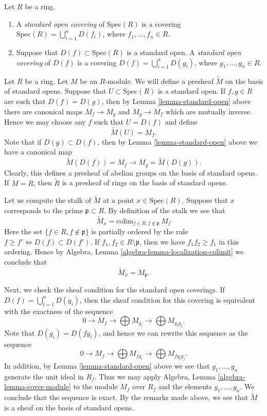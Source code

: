 \begin{definition}
\label{definition-standard-covering}
Let $R$ be a ring.
\begin{enumerate}
\item A {\it standard open covering} of $\text{Spec}(R)$
is a covering $\text{Spec}(R) = \bigcup_{i=1}^n D(f_i)$,
where $f_1,\ldots, f_n \in R$.
\item Suppose that $D(f) \subset \text{Spec}(R)$ is a standard
open. A {\it standard open covering} of $D(f)$
is a covering $D(f) = \bigcup_{i=1}^n D(g_i)$,
where $g_1,\ldots, g_n \in R$.
\end{enumerate}
\end{definition}

\noindent
Let $R$ be a ring. Let $M$ be an $R$-module. We will define
a presheaf $\widetilde M$ on the basis of standard opens.
Suppose that $U \subset \text{Spec}(R)$ is a standard open.
If $f, g \in R$ are such that $D(f) = D(g)$, then
by Lemma \ref{lemma-standard-open} above there are canonical
maps $M_f \to M_g$ and $M_g \to M_f$ which are mutually inverse.
Hence we may choose any $f$ such that $U = D(f)$
and define
$$
\widetilde M(U) = M_f.
$$
Note that if $D(g) \subset D(f)$, then by
Lemma \ref{lemma-standard-open} above we have
a canonical map
$$
\widetilde M(D(f)) = M_f \longrightarrow M_g = \widetilde M(D(g)).
$$
Clearly, this defines a presheaf of abelian groups on the basis
of standard opens. If $M = R$, then $\widetilde R$ is a presheaf
of rings on the basis of standard opens.

\medskip\noindent
Let us compute the stalk of $\widetilde M$ at a point $x \in \text{Spec}(R)$.
Suppose that $x$ corresponds to the prime $\mathfrak p \subset R$.
By definition of the stalk we see that
$$
\widetilde M_x = \text{colim}_{f\in R, f\not\in \mathfrak p}\ M_f
$$
Here the set $\{f\in R, f\not\in \mathfrak p\}$ is partially
ordered by the rule $f \geq f' \Leftrightarrow D(f) \subset D(f')$.
If $f_1, f_2 \in R \setminus \mathfrak p$, then we have
$f_1f_2 \geq f_1$ in this ordering. Hence by
Algebra, Lemma \ref{algebra-lemma-localization-colimit}
we conclude that
$$
\widetilde M_x = M_{\mathfrak p}.
$$

\medskip\noindent
Next, we check the sheaf condition for the standard open coverings.
If $D(f) = \bigcup_{i=1}^n D(g_i)$, then the sheaf condition
for this covering is equivalent with the exactness of the
sequence
$$
0 \to M_f \to \bigoplus M_{g_i} \to \bigoplus M_{g_ig_j}.
$$
Note that $D(g_i) = D(fg_i)$, and hence we can rewrite this
sequence as the sequence
$$
0 \to M_f \to \bigoplus M_{fg_i} \to \bigoplus M_{fg_ig_j}.
$$
In addition, by Lemma \ref{lemma-standard-open} above
we see that $g_1,\ldots,g_n$ generate the unit ideal
in $R_f$. Thus we may apply
Algebra, Lemma \ref{algebra-lemma-cover-module}
to the module $M_f$ over $R_f$ and the elements $g_1,\ldots,g_n$.
We conclude that the sequence is exact. By the remarks
made above, we see that $\widetilde M$ is a sheaf
on the basis of standard opens.

